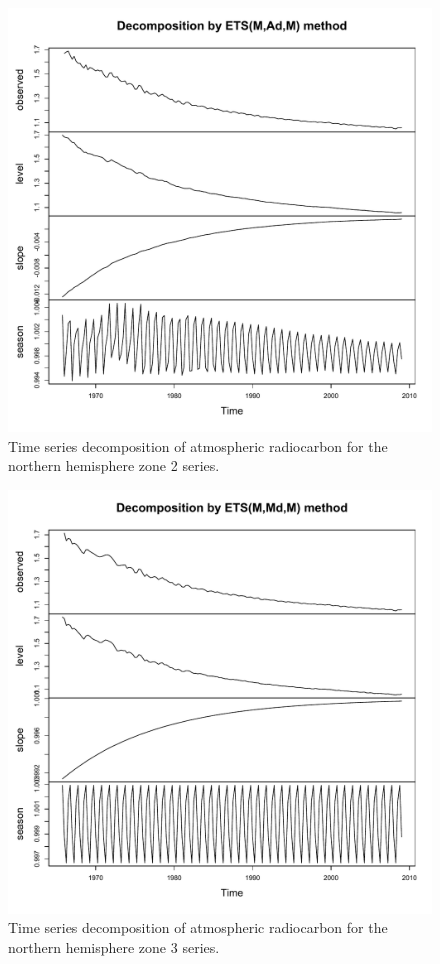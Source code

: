 \documentclass[draft,grl]{agutexSI}
\begin{document}
\begin{figure}[htbp]
   \centering
   \includegraphics[scale=0.7]{Figures/tsNHZ2} %
   \caption{Time series decomposition of atmospheric radiocarbon for the northern hemisphere zone 2 series. }
   \label{fig:tsNHZ2}
\end{figure}

\begin{figure}[htbp]
   \centering
   \includegraphics[scale=0.7]{Figures/tsNHZ3} %
   \caption{Time series decomposition of atmospheric radiocarbon for the northern hemisphere zone 3 series. }
   \label{fig:tsNHZ3}
\end{figure}
\end{document}
